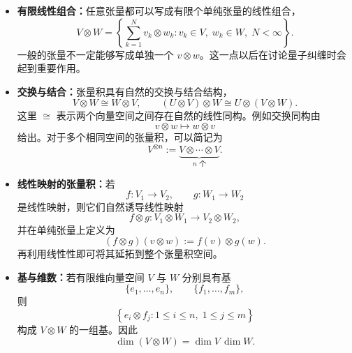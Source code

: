 \documentclass[UTF8,a4paper,11pt,openany]{ctexbook}
\begin{document}
\begin{itemize}
    \item \textbf{有限线性组合：}任意张量都可以写成有限个单纯张量的线性组合，
    \begin{equation}
        V\otimes W
        =
        \left\{
            \sum_{k=1}^{N}v_k\otimes w_k:
            v_k\in V,\;
            w_k\in W,\;
            N<\infty
        \right\}.
    \end{equation}
    一般的张量不一定能够写成单独一个 $v\otimes w$。这一点以后在讨论量子纠缠时会起到重要作用。

    \item \textbf{交换与结合：}张量积具有自然的交换与结合结构，
    \begin{equation}
        V\otimes W\cong W\otimes V,
        \qquad
        (U\otimes V)\otimes W
        \cong
        U\otimes(V\otimes W).
    \end{equation}
    这里 $\cong$ 表示两个向量空间之间存在自然的线性同构。例如交换同构由
    \[
        v\otimes w\longmapsto w\otimes v
    \]
    给出。对于多个相同空间的张量积，可以简记为
    \begin{equation}
        V^{\otimes n}
        :=
        \underbrace{
            V\otimes\cdots\otimes V
        }_{n\text{ 个}}.
    \end{equation}

    \item \textbf{线性映射的张量积：}若
    \[
        f:V_1\to V_2,
        \qquad
        g:W_1\to W_2
    \]
    是线性映射，则它们自然诱导线性映射
    \begin{equation}
        f\otimes g:
        V_1\otimes W_1
        \longrightarrow
        V_2\otimes W_2,
    \end{equation}
    并在单纯张量上定义为
    \begin{equation}
        (f\otimes g)(v\otimes w)
        :=
        f(v)\otimes g(w).
    \end{equation}
    再利用线性性即可将其延拓到整个张量积空间。

    \item \textbf{基与维数：}若有限维向量空间 $V$ 与 $W$ 分别具有基
    \[
        \{e_1,\ldots,e_n\},
        \qquad
        \{f_1,\ldots,f_m\},
    \]
    则
    \begin{equation}
        \left\{
            e_i\otimes f_j:
            1\leq i\leq n,\;
            1\leq j\leq m
        \right\}
    \end{equation}
    构成 $V\otimes W$ 的一组基。因此
    \begin{equation}
        \dim(V\otimes W)
        =
        \dim V\,\dim W.
    \end{equation}


\end{itemize}
\end{document}
